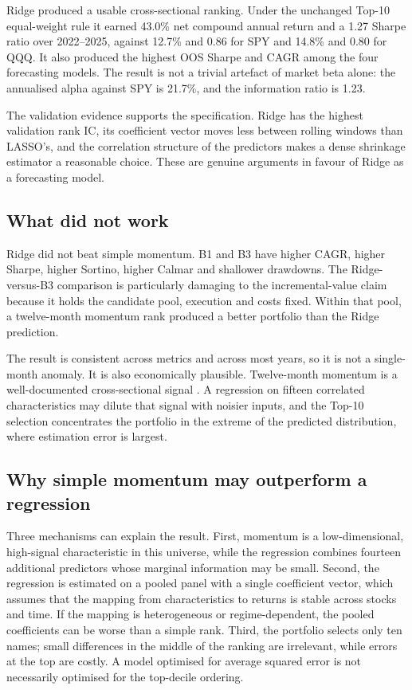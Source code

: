 \documentclass[11pt,a4paper]{article}
\begin{document}
Ridge produced a usable cross-sectional ranking. Under the unchanged Top-10 equal-weight rule it earned 43.0\% net compound annual return and a 1.27 Sharpe ratio over 2022--2025, against 12.7\% and 0.86 for SPY and 14.8\% and 0.80 for QQQ. It also produced the highest OOS Sharpe and CAGR among the four forecasting models. The result is not a trivial artefact of market beta alone: the annualised alpha against SPY is 21.7\%, and the information ratio is 1.23.

The validation evidence supports the specification. Ridge has the highest validation rank IC, its coefficient vector moves less between rolling windows than LASSO's, and the correlation structure of the predictors makes a dense shrinkage estimator a reasonable choice. These are genuine arguments in favour of Ridge as a forecasting model.

\subsection{What did not work}

Ridge did not beat simple momentum. B1 and B3 have higher CAGR, higher Sharpe, higher Sortino, higher Calmar and shallower drawdowns. The Ridge-versus-B3 comparison is particularly damaging to the incremental-value claim because it holds the candidate pool, execution and costs fixed. Within that pool, a twelve-month momentum rank produced a better portfolio than the Ridge prediction.

The result is consistent across metrics and across most years, so it is not a single-month anomaly. It is also economically plausible. Twelve-month momentum is a well-documented cross-sectional signal \citep{jegadeesh1993, asness2013}. A regression on fifteen correlated characteristics may dilute that signal with noisier inputs, and the Top-10 selection concentrates the portfolio in the extreme of the predicted distribution, where estimation error is largest.

\subsection{Why simple momentum may outperform a regression}

Three mechanisms can explain the result. First, momentum is a low-dimensional, high-signal characteristic in this universe, while the regression combines fourteen additional predictors whose marginal information may be small. Second, the regression is estimated on a pooled panel with a single coefficient vector, which assumes that the mapping from characteristics to returns is stable across stocks and time. If the mapping is heterogeneous or regime-dependent, the pooled coefficients can be worse than a simple rank. Third, the portfolio selects only ten names; small differences in the middle of the ranking are irrelevant, while errors at the top are costly. A model optimised for average squared error is not necessarily optimised for the top-decile ordering.
\end{document}
